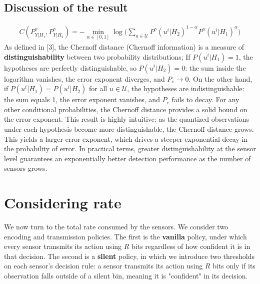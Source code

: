 \documentclass[11pt]{article}
\begin{document}
\subsection*{Discussion of the result}
\begin{align}
    C(P^\gamma_{Y|H_1},P^\gamma_{Y|H_2}) = -\min_{\alpha \in [0,1]}\log\bigg(\sum_{u \in \mathcal{U}} P^{\gamma}(u^i|H_2)^{1-\alpha}P^{\gamma}(u^i|H_1)^{\alpha}\bigg) \label{eq:chernoff-distance}
\end{align}
As defined in [3], the Chernoff distance (Chernoff information) is a measure of \textbf{distinguishability} between two probability distributions;\newline
If $P(u^i|H_1) = 1$, the hypotheses are perfectly distinguishable, so $P(u^i|H_2) = 0$: the sum inside the logarithm vanishes, the error exponent diverges, and $P_e \to 0$.\newline
On the other hand, if $P(u^i|H_1) = P(u^i|H_2)$ for all $u \in \mathcal{U}$, the hypotheses are indistinguishable: the sum equals 1, the error exponent vanishes, and $P_e$ fails to decay.\newline
For any other conditional probabilities, the Chernoff distance provides a solid bound on the error exponent.\newline
This result is highly intuitive: as the quantized observations under each hypothesis become more distinguishable, the Chernoff distance grows. This yields a larger error exponent, which drives a steeper exponential decay in the probability of error. In practical terms, greater distinguishability at the sensor level guarantees an exponentially better detection performance as the number of sensors grows.
\newpage

\section{Considering rate}
\label{sec:considering-rate}
We now turn to the total rate consumed by the sensors. We consider two encoding and transmission policies. 
The first is the \textbf{vanilla} policy, under which every sensor transmits its action using $R$ bits regardless of how confident it is in that decision.
The second is a \textbf{silent} policy, in which we introduce two thresholds on each sensor's decision rule: a sensor transmits its action using $R$ bits only if its observation falls outside of a silent bin, meaning it is "confident" in its decision.
\end{document}

